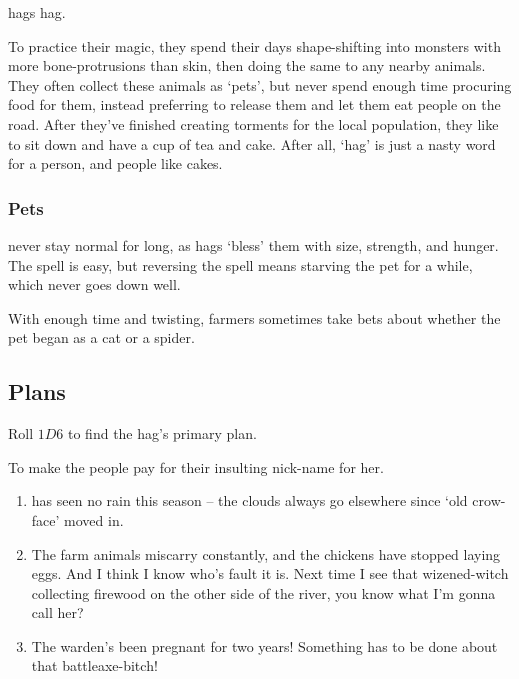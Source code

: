 \begin{multicols}{2}

\noindent
\Glspl{hag} \glsdesc{hag}.

To practice their magic, they spend their days shape-shifting into monsters with more bone-protrusions than skin, then doing the same to any nearby animals.
They often collect these animals as `pets', but never spend enough time procuring food for them, instead preferring to release them and let them eat people on the road.
After they've finished creating torments for the local population, they like to sit down and have a cup of tea and cake.
After all, `hag' is just a nasty word for a person, and people like cakes.

\hag

\showStdSpells

\subsubsection{Pets}
never stay normal for long, as hags `bless' them with size, strength, and hunger.
The spell is easy, but reversing the spell means starving the pet for a while, which never goes down well.

\ifodd\value{r4}
\else
\fi

With enough time and twisting, farmers sometimes take bets about whether the pet began as a cat or a spider.

\subsection{Plans}

Roll $1D6$ to find the hag's primary plan.

\begin{dlist}
  \item
  To make the people pay for their insulting nick-name for her.
  \begin{enumerate}
    \item
     has seen no rain this season -- the clouds always go elsewhere since `old crow-face' moved in.
    \item
    The farm animals miscarry constantly, and the chickens have stopped laying eggs.
    And I think I know who's fault it is.
    Next time I see that wizened-\gls{witch} collecting firewood on the other side of the river, you know what I'm gonna call her?
    \item
    The \gls{warden}'s been pregnant for two years!
    Something has to be done about that battleaxe-bitch!
  \end{enumerate}


\end{dlist}
\end{multicols}
